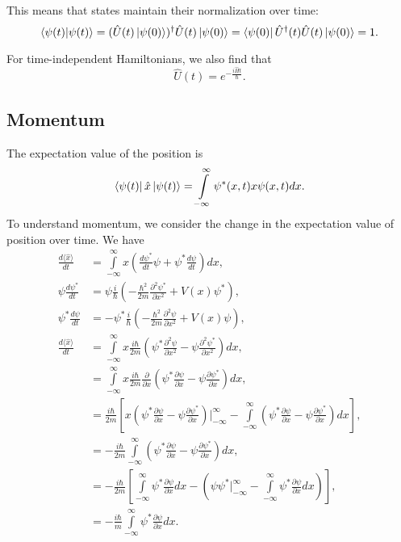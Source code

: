 This means that states maintain their normalization over time:
\begin{equation*}
\left\langle \psi(t) \middle| \psi(t) \right\rangle = (\hat{U} (t) \left| \psi (0) \right\rangle)^{\dagger} \hat{U} (t) \left| \psi (0) \right\rangle
= \left\langle \psi(0) \right| \hat{U}^{\dagger}(t)\hat{U}(t) \left| \psi(0) \right\rangle = 1.
\end{equation*}

For time-independent Hamiltonians, we also find that 
\begin{equation} \hat{U}(t) = e^{-\frac{i\hat{H} t}{\hbar}}. \end{equation}
\subsection{Momentum}
The expectation value of the position is 
\begin{equation}
\left\langle \psi(t) \right|\hat{x}\left| \psi(t) \right\rangle =  \int\limits_{-\infty}^{\infty} \psi^*(x,t) x \psi(x,t) dx.
\end{equation} 
To understand momentum, we consider the change in the expectation value of position over time. We have 
\begin{align*}
\frac{d \langle \hat{x} \rangle}{dt} &= \int\limits_{-\infty}^{\infty} x\left(\frac{d\psi^*}{dt}  \psi  +\psi^*  \frac{d\psi}{dt}\right) dx,\\
\psi \frac{d\psi^*}{dt} &= \psi \frac{i}{\hbar} \left( -\frac{\hbar^2}{2m} \frac{\partial^2 \psi^*}{\partial x^2} + V(x) \psi^* \right),\\
\psi^* \frac{d\psi}{dt} &= -\psi^* \frac{i}{\hbar} \left( -\frac{\hbar^2}{2m} \frac{\partial^2 \psi}{\partial x^2} + V(x) \psi \right),\\
\frac{d \langle \hat{x} \rangle}{dt} &= \int\limits_{-\infty}^{\infty} x\frac{i\hbar}{2m} \left(\psi^*\frac{\partial^2 \psi}{\partial x^2}-\psi\frac{\partial^2 \psi^*}{\partial x^2} \right) dx,\\
&=  \int\limits_{-\infty}^{\infty} x\frac{i\hbar}{2m} \frac{\partial}{\partial x} \left(\psi^*\frac{\partial \psi}{\partial x}-\psi\frac{\partial \psi^*}{\partial x} \right)dx, \\
&= \frac{i\hbar}{2m} \left[x\left(\psi^*\frac{\partial \psi}{\partial x}-\psi\frac{\partial \psi^*}{\partial x} \right) \Bigg|_{-\infty}^{\infty} -  \int\limits_{-\infty}^{\infty} \left(\psi^*\frac{\partial \psi}{\partial x}-\psi\frac{\partial \psi^*}{\partial x} \right)dx \right],\\
&= -\frac{i\hbar}{2m}  \int\limits_{-\infty}^{\infty} \left(\psi^*\frac{\partial \psi}{\partial x}-\psi\frac{\partial \psi^*}{\partial x} \right)dx,\\
&= -\frac{i\hbar}{2m} \left[\int\limits_{-\infty}^{\infty} \psi^*\frac{\partial \psi}{\partial x}dx-\left(\psi \psi^* \Bigg|_{-\infty}^{\infty}-\int\limits_{-\infty}^{\infty}\psi^*\frac{\partial \psi}{\partial x} dx\right)\right],\\
&= -\frac{i\hbar}{m} \int\limits_{-\infty}^{\infty} \psi^*\frac{\partial \psi}{\partial x}dx.
\end{align*}

